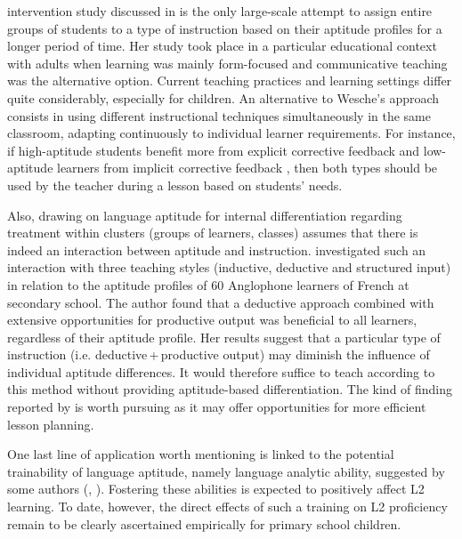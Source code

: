 \documentclass[output=paper]{langscibook}
\begin{document}
 intervention study discussed in  is the only large-scale attempt to assign entire groups of students to a type of instruction based on their aptitude profiles for a longer period of time. Her study took place in a particular educational context with adults when learning was mainly form-focused and communicative teaching was the alternative option. Current teaching practices and learning settings differ quite considerably, especially for children. An alternative to Wesche’s approach consists in using different instructional techniques simultaneously in the same classroom, adapting continuously to individual learner requirements. For instance, if high-aptitude students benefit more from explicit corrective feedback and low-aptitude learners from implicit corrective feedback \citep{Li2017}, then both types should be used by the teacher during a lesson based on students’ needs. 

Also, drawing on language aptitude for internal differentiation regarding treatment within clusters (groups of learners, classes) assumes that there is indeed an interaction between aptitude and instruction. \citet{Erlam2005} investigated such an interaction with three teaching styles (inductive, deductive and structured input) in relation to the aptitude profiles of 60 Anglophone learners of French at secondary school. The author found that a deductive approach combined with extensive opportunities for productive output was beneficial to all learners, regardless of their aptitude profile. Her results suggest that a particular type of instruction (i.e. deductive\,+\,productive output) may diminish the influence of individual aptitude differences. It would therefore suffice to teach according to this method without providing aptitude-based differentiation. The kind of finding reported by \citet{Erlam2005} is worth pursuing as it may offer opportunities for more efficient lesson planning.

One last line of application worth mentioning is linked to the potential trainability of language aptitude, namely language analytic ability, suggested by some authors (\citealt{GrigorenkoEtAl2000}, \citealt{SafarKormos2008}). Fostering these abilities is expected to positively affect L2 learning. To date, however, the direct effects of such a training on L2 proficiency remain to be clearly ascertained empirically for primary school children.
\end{document}
